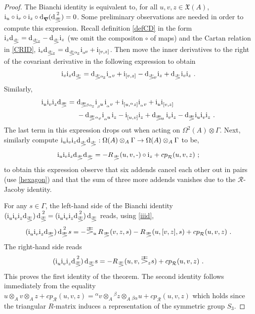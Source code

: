\documentclass[10pt,a4paper]{amsart}
\def\BDst{\dd_{\!\!}\Bpdst}
\def\Bpdst{{}_{\,}{\reflectbox{\mbox{$\Bpstd$}}}}
\def\Bpstd{{}^{\phantom{J}}_{\raisebox{\depth}{\scalebox{.75}[-.75]{\mbox{${\bm
            \Delta}$}}}}}
\def\Vect{\mathfrak{X}}
\def\al{\alpha}
\def\be{\beta}
\def\dd{\mathrm{d}}
\def\ii{\mathrm{i}}
\def\pstd{{}^{\phantom{J}}_{\raisebox{\depth}{\scalebox{1.1}[-.75]{\mbox{${\mathbb
            \Delta}$}}}}}
\def\stD{\dd\pstd}
\def\stDav{\stD{}_{\mbox{$\!{}^{}_{{\,}^\al\!\;\! v}\!$}}}
\def\stDaz{\stD{}_{\mbox{$\!{}^{}_{{\:\!}^\al \!z}\!$}}}
\def\stDbaz{\stD{}_{\mbox{$\!{}^{}_{{\:\!}^{\beta\al}\! z}\!$}}}
\def\stDu{\stD{}_{\mbox{$\!{}^{}_u$}}}
\def\stDv{\stD{}_{\mbox{$\!{}^{}_v$}}}
\def\stDz{\stD{}_{\mbox{$\!{}^{}_z$}}}
\def\std{{\raisebox{\depth}{\scalebox{1.45}[-1]{\mbox{$\mathbb \Delta$}}}}_{\!}}
\def\stdd{\phantom{\!\!\!\dd}\pstd}
\begin{document}
\begin{proof}
The Bianchi identity is equivalent to, for all $u,v,z\in \Vect(A)$, $\ii_u\circ \ii_v\circ \ii_z\circ \BDst({\stD}^{\!\!\!\!\!2}\:)=0$. Some preliminary observations are needed in order to compute this expression.   Recall definition \ref{defCD} in the form 
$\ii_z \stD=\stDz-\stD \ii_z$ (we omit the compositon $\circ$ of maps) and the Cartan relation in \eqref{CRID},
$\ii_v \stDz =\stDaz  {_{\,}}\ii_{{}_\al\! v} +\ii_{[v,z]}$.
Then move the inner derivatives to the right of the covariant derivative in the following expression to obtain 
$$
\ii_v\ii_z\stD=\stDaz  {_{\,}}\ii_{{}_\al v} +\ii_{[v,z]}-\stDv \ii_z+ \stD \ii_v\ii_z~.$$
Similarly,
\begin{equation}\label{iiid}\begin{split}
  \ii^{}_u \ii^{}_v\ii^{}_z\stD =~ & \stDbaz{}_{\,}\ii^{}_{{}^{}_\beta \!\!\; u\,} \ii^{}_{{}^{}_\al v}+ \ii^{}_{[u,{}^\alpha z]}\ii^{}_{{}_\alpha v}+ \ii^{}_u \ii^{}_{[v,z]} \\
  & -\stDav{} _{\,}\ii^{}_{{}^{}_\al \!\!\; u\,} \ii^{}_{z}- \ii^{}_{[u,v]}\ii^{}_{z}+
\stDu{}_{\,}\ii^{}_{v} \ii^{}_{z}-\stD  \ii^{}_u \ii^{}_v\ii^{}_z~.
\end{split}
\end{equation}
The last term in this expression drops out when acting on $\Omega^2(A)\otimes\Gamma$.
Next, similarly compute $\ii_u \ii_v \ii_z \stD\stD: \Omega(A)\otimes_A\Gamma\to  \Omega(A)\otimes_A\Gamma$ to be,
\begin{equation}\label{iiiddR}
\ii_u \ii_v \ii_z\stD\stD=- R\stdd(u,v,\mbox{-})\circ \ii_z +cp^{}_{\mathcal{R}}(u,v,z)~;
\end{equation}
to obtain this expression observe that six addends cancel each other out in pairs (use \eqref{hexagon}) and that the sum of three more addends vanishes due to the  ${\mathcal{R}}$-Jacoby identity.


For any $s\in \Gamma$, the left-hand side of the Bianchi identity   
$(\ii^{}_u \ii^{}_v\ii^{}_z\stD)\,{\stD}^{\!\!\!\!\!2\,}=(\ii^{}_u \ii^{}_v\ii^{}_z{\stD}^{\!\!\!\!\!2}\,)\,\stD$
reads, using \eqref{iiid},
\begin{equation}\label{RBL}
  (\ii^{}_u \ii^{}_v\ii^{}_z\stD)\,{\stD}^{\!\!\!\!\!2}\;s=-\std{}_u{\,}R\stdd(v,z,s)-R\stdd(u,[v,z],s)+cp^{}_{\mathcal{R}}(u,v,z)~.
  \end{equation}
The right-hand side reads 
\begin{equation}\label{RBR}
  (\ii^{}_u \ii^{}_v\ii^{}_z{\stD}^{\!\!\!\!\!2\,})\,\stD s=-R\stdd(u,v,{\std}{}_z s)+cp^{}_{\mathcal{R}}(u,v,z)~.
  \end{equation}
This proves the first identity of the theorem. The second identity  follows immediately from the equality
$u\otimes_Av\otimes_A z +cp^{}_{\mathcal{R}}(u,v,z)={}^\al v\otimes_A{}^\be z\otimes_A {}_{\be\al}u +cp^{}_{\mathcal{R}}(u,v,z)$ which holds since the triangular $R$-matrix induces a representation of the symmetric group $S_3$.
\end{proof}
\end{document}
